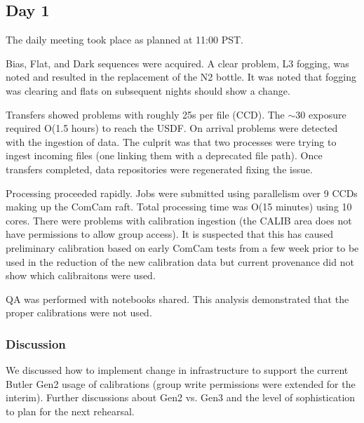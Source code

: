 \subsection{Day 1} \label{sec:day1}

The daily meeting took place as planned at 11:00 PST.

Bias, Flat, and Dark sequences were acquired.  A clear problem, L3 fogging, was 
noted and resulted in the replacement of the N2 bottle.  It was noted that 
fogging was clearing and flats on subsequent nights should show a change.  

Transfers showed problems with roughly 25s per file (CCD).  The $\sim$30 exposure 
required O(1.5 hours) to reach the USDF.  On arrival problems were detected with
the ingestion of data.  The culprit was that two processes were trying to ingest 
incoming files (one linking them with a deprecated file path).  Once transfers 
completed, data repositories were regenerated fixing the issue.  

Processing proceeded rapidly.  Jobs were submitted using parallelism over 9 CCDs
making up the ComCam raft.  Total processing time was O(15 minutes) using 10 cores.
There were problems with calibration ingestion (the CALIB area does not have 
permissions to allow group access).  It is suspected that this has caused preliminary 
calibration based on early ComCam tests from a few week prior to be used in the 
reduction of the new calibration data but current provenance did not show
which calibraitons were used.

QA was performed with notebooks shared.  This analysis demonstrated that the 
proper calibrations were not used.  

\subsubsection{Discussion}
We discussed how to implement change in infrastructure to support the current
Butler Gen2 usage of calibrations (group write permissions were extended for the
interim).  Further discussions about Gen2 vs. Gen3 and the level of sophistication
to plan for the next rehearsal.  

